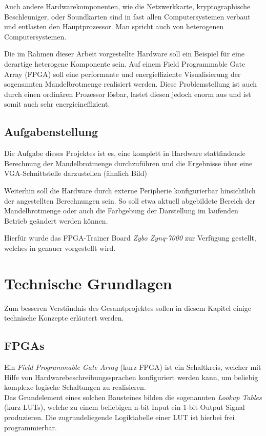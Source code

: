 \documentclass[a4paper,12pt,onesided]{report}
\begin{document}
Auch andere Hardwarekomponenten, wie die Netzwerkkarte, kryptographische Beschleuniger, oder Soundkarten sind in fast allen Computersystemen verbaut und entlasten den Hauptprozessor. Man spricht auch von heterogenen Computersystemen.

Die im Rahmen dieser Arbeit vorgestellte Hardware soll ein Beispiel für eine derartige heterogene Komponente sein. Auf einem Field Programmable Gate Array (FPGA) %
soll eine performante und energieffiziente Visualisierung der sogenannten Mandelbrotmenge realisiert werden. Diese Problemstellung ist auch durch einen ordinären Prozessor lösbar, lastet diesen jedoch enorm aus und ist somit auch sehr energieineffizient. %

\section{Aufgabenstellung}
Die Aufgabe dieses Projektes ist es, eine komplett in Hardware stattfindende Berechnung der Mandelbrotmenge durchzuführen und die Ergebnisse über eine VGA-Schnittstelle darzustellen (ähnlich Bild) %

Weiterhin soll die Hardware durch externe Peripherie konfigurierbar hinsichtlich der angestellten Berechnungen sein. So soll etwa aktuell abgebildete Bereich der Mandelbrotmenge oder auch die Farbgebung der Darstellung im laufenden Betrieb geändert werden können.

Hierfür wurde das FPGA-Trainer Board \textit{Zybo Zynq-7000} zur Verfügung gestellt, welches in %
genauer vorgestellt wird.

\chapter{Technische Grundlagen}
Zum besseren Verständnis des Gesamtprojektes sollen in diesem Kapitel einige technische Konzepte erläutert werden.


\section{FPGAs}
Ein \textit{Field Programmable Gate Array} (kurz FPGA) ist ein Schaltkreis, welcher mit Hilfe von Hardwarebeschreibungssprachen %
konfiguriert werden kann, um beliebig komplexe logische Schaltungen zu realisieren.\\
Das Grundelement eines solchen Bausteines bilden die sogenannten \textit{Lookup Tables} (kurz LUTs), welche zu einem beliebigen n-bit Input ein 1-bit Output Signal produzieren. Die zugrundeliegende Logiktabelle einer LUT ist hierbei frei programmierbar.
\end{document}
